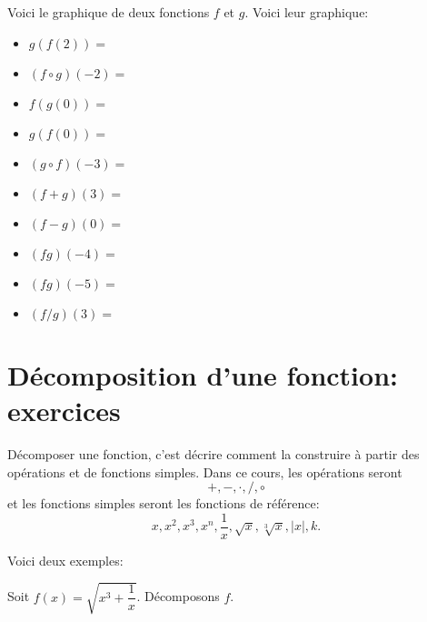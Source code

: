 \documentclass[a4paper,12pt]{report}
\begin{document}
\begin{exercice}
Voici le graphique de deux fonctions \(f\) et \(g\). Voici leur graphique:
\begin{center}

\end{center}
\par \setlength{\columnseprule}{0 pt}
          \begin{minipage}[t]{\linewidth}
          \begin{multicols}{2}
\begin{itemize}
\item \(g(f(2))=\) \dotfill

\item \((f\circ g)(-2)=\) \dotfill

\item \(f(g(0))=\) \dotfill

\item \(g(f(0))=\) \dotfill

\item \((g\circ f)(-3)=\) \dotfill

\item \((f+g)(3)=\) \dotfill

\item \((f-g)(0)=\) \dotfill

\item \((fg)(-4)=\) \dotfill

\item \((fg)(-5)=\) \dotfill

\item \((f/g)(3)=\) \dotfill
\end{itemize}


\end{multicols}\end{minipage}
\end{exercice}


\section{Décomposition d'une fonction: exercices}
\label{sec:orgf5b9e71}
Décomposer une fonction, c'est décrire comment la construire à partir des
opérations et de fonctions simples. Dans ce cours, les opérations seront
\[
+,-,\cdot,/,\circ
\]
et les fonctions simples seront les fonctions de référence:
\[
x,x^2,x^3,x^n,\dfrac{1}{x}, \sqrt{x},\sqrt[3]{x},|x|,k.
\]

Voici deux exemples:
\newpage
\begin{exemple}
Soit \(f(x)=\sqrt{x^3+\dfrac{1}{x}}\). Décomposons \(f\).
\vspace{10cm}
\end{exemple}
\end{document}
